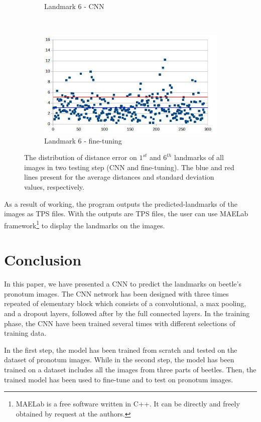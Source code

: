 \documentclass[10pt]{article}
\begin{document}
\begin{figure}[htbp]
\begin{subfigure}[t]{0.25\textwidth}
        \caption{\small{Landmark 6 - CNN}}
        \label{figsub111}
    \end{subfigure}%
    ~ 
    \begin{subfigure}[t]{0.25\textwidth}
        \centering
        \includegraphics[scale=.32]{images/lm6_finetuning_2}
        \caption{\small{Landmark 6 - fine-tuning}}
        \label{figsub222}
    \end{subfigure}
    \caption{\small{The distribution of distance error on $1^{st}$ and $6^{th}$ landmarks of all images in two testing step (CNN and fine-tuning). The blue and red lines present for the average distances and standard deviation values, respectively.}}
    \label{figrsexample2}
\end{figure}

As a result of working, the program outputs the
predicted-landmarks of the images as TPS files. With the outputs are TPS files,
the user can use MAELab framework\footnote{MAELab is a free software written in C++. It can be directly and freely
obtained by request at the authors.} to display the
landmarks on the images.
\section{Conclusion}
In this paper, we have presented a CNN to predict the landmarks on beetle's pronotum images. The CNN network has been designed with three times repeated of elementary block which consists of a convolutional, a max pooling, and a dropout layers, followed after by the full connected layers. In the training phase, the CNN have been trained several times with different selections of training data.

In the first step, the model has been trained from scratch and tested on the dataset of pronotum images. While in the second step, the model has been trained on a dataset includes all the images from three parts of beetles. Then, the trained model has been used to fine-tune and to test on pronotum images.
\end{document}
